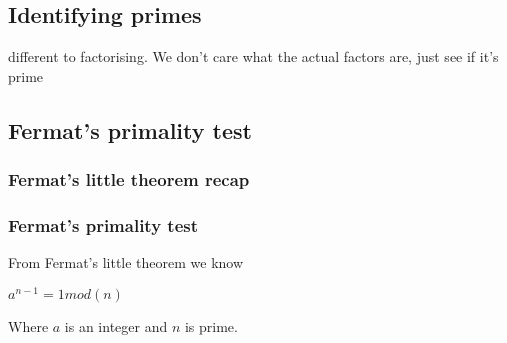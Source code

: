 
\subsection{Identifying primes}

different to factorising. We don't care what the actual factors are, just see if it's prime

\subsection{Fermat's primality test}

\subsubsection{Fermat's little theorem recap}

\subsubsection{Fermat's primality test}

From Fermat's little theorem we know

\(a^{n-1}=1 mod(n)\)

Where \(a\) is an integer and \(n\) is prime.

